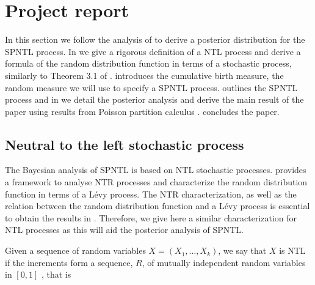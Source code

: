 

\section{Project report}\label{project_report}

In this section we follow the analysis of \cite{james2006poisson} to derive a posterior distribution for the SPNTL process. In  we give a rigorous definition of a NTL process and derive a formula of the random distribution function in terms of a stochastic process, similarly to Theorem 3.1 of \cite{doksum1974tailfree}.  introduces the cumulative birth measure, the random measure we will use to specify a SPNTL process.  outlines the SPNTL process and in  we detail the posterior analysis and derive the main result of the paper using results from Poisson partition calculus \cite{james2005poisson,james2006poisson}.  concludes the paper.

\subsection{Neutral to the left stochastic process}\label{NTL_definition}
The Bayesian analysis of SPNTL is based on NTL stochastic processes. \cite{doksum1974tailfree} provides a framework to analyse NTR processes and characterize the random distribution function in terms of a L{\'e}vy process. The NTR characterization, as well as the relation between the random distribution function and a L{\'e}vy process is essential to obtain the results in \cite{james2006poisson}. Therefore, we give here a similar characterization for NTL processes as this will aid the posterior analysis of SPNTL.

Given a sequence of random variables $X = (X_1, \ldots, X_k)$, we say that $X$ is NTL if the increments form a sequence, $R$, of mutually independent random variables in $[0, 1]$ \cite{bloem2018sampling}, that is

